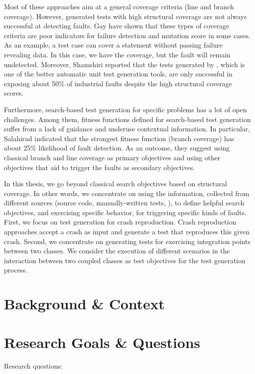 Most of these approaches aim at a general coverage criteria (\eg line and branch coverage). However,  generated tests with high structural coverage are not always successful at detecting faults. Gay \etal \cite{gay2015risks} have shown that these types of coverage criteria are poor indicators for failure detection and mutation score in some cases. As an example, a test case can cover a statement without passing failure revealing data. In this case, we have the coverage, but the fault will remain undetected.
Moreover, Shamshiri \etal \cite{Shamshiri2016} reported that the tests generated by \evosuite, which is one of the better automatic unit test generation tools, are only successful in exposing about 50\% of industrial faults despite the high structural coverage scores. 

Furthermore, search-based test generation for specific problems has a lot of open challenges. Among them, fitness functions defined for search-based test generation suffer from a lack of guidance and underuse contextual information.  
In particular, Salahirad \etal \cite{Salahirad2019} indicated that the strongest fitness function (branch coverage) has about 25\% likelihood of fault detection.
As an outcome, they suggest using classical branch and line coverage as primary objectives and using other objectives that aid to trigger the faults as secondary objectives.

In this thesis, we go beyond classical search objectives based on structural coverage. In other words, we concentrate on using the information, collected from different sources (\ie source code, manually-written tests, \etc), to define helpful search objectives, and exercising specific behavior, for triggering specific kinds of faults. First, we focus on test generation for crash reproduction. Crash reproduction approaches \cite{Soltani2018a, BPT17concrash, Chen2015, Nayrolles2017, Rossler2013, Xuan2015} accept a crash as input and generate a test that reproduces this given crash. Second, we concentrate on generating tests for exercising integration points between two classes. We consider the execution of different scenarios in the interaction between two coupled classes as test objectives for the test generation process.

\section{Background \& Context}



\section{Research Goals \& Questions}
Research questions:


